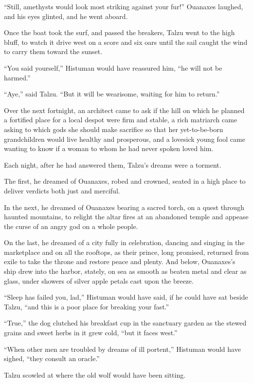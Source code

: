 ``Still, amethysts would look most striking against your fur!'' Ouanaxes laughed, and his eyes glinted, and he went aboard.

Once the boat took the surf, and passed the breakers, Talzu went to the high bluff, to watch it drive west on a score and six oars until the sail caught the wind to carry them toward the sunset.

``You said yourself,'' Histuman would have reassured him, ``he will not be harmed.''

``Aye,'' said Talzu. ``But it will be wearisome, waiting for him to return.''

\secdiv

Over the next fortnight, an architect came to ask if the hill on which he planned a fortified place for a local despot were firm and stable, a rich matriarch came asking to which gods she should make sacrifice so that her yet-to-be-born grandchildren would live healthy and prosperous, and a lovesick young fool came wanting to know if a woman to whom he had never spoken loved him.

Each night, after he had answered them, Talzu's dreams were a torment.

The first, he dreamed of Ouanaxes, robed and crowned, seated in a high place to deliver verdicts both just and merciful.

In the next, he dreamed of Ouanaxes bearing a sacred torch, on a quest through haunted mountains, to relight the altar fires at an abandoned temple and appease the curse of an angry god on a whole people.

On the last, he dreamed of a city fully in celebration, dancing and singing in the marketplace and on all the rooftops, as their prince, long promised, returned from exile to take the throne and restore peace and plenty. And below, Ouanaxes's ship drew into the harbor, stately, on sea as smooth as beaten metal and clear as glass, under showers of silver apple petals cast upon the breeze.

``Sleep has failed you, lad,'' Histuman would have said, if he could have sat beside Talzu, ``and this is a poor place for breaking your fast.''

``True,'' the dog clutched his breakfast cup in the sanctuary garden as the stewed grains and sweet herbs in it grew cold, ``but it faces west.''

``When other men are troubled by dreams of ill portent,'' Histuman would have sighed, ``they consult an oracle.''

Talzu scowled at where the old wolf would have been sitting.

